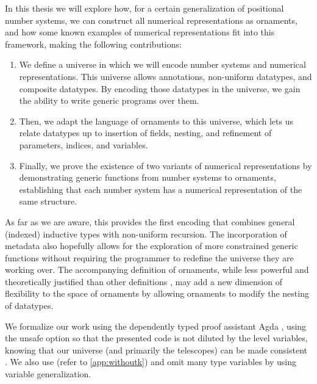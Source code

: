 In this thesis we will explore how, for a certain generalization of positional number systems, we can construct all numerical representations as ornaments, and how some known examples of numerical representations fit into this framework, making the following contributions:
\begin{enumerate}
    \item We define a universe in which we will encode number systems and numerical representations. This universe allows annotations, non-uniform datatypes, and composite datatypes. By encoding those datatypes in the universe, we gain the ability to write generic programs over them.
    \item Then, we adapt the language of ornaments to this universe, which lets us relate datatypes up to insertion of fields, nesting, and refinement of parameters, indices, and variables.
    \item Finally, we prove the existence of two variants of numerical representations by demonstrating generic functions from number systems to ornaments, establishing that each number system has a numerical representation of the same structure.
\end{enumerate}
As far as we are aware, this provides the first encoding that combines general (indexed) inductive types with non-uniform recursion. The incorporation of metadata also hopefully allows for the exploration of more constrained generic functions %
without requiring the programmer to redefine the universe they are working over. The accompanying definition of ornaments, while less powerful and theoretically justified than other definitions \cite{sijsling,kophd}, may add a new dimension of flexibility to the space of ornaments by allowing ornaments to modify the nesting of datatypes.

We formalize our work using the dependently typed proof assistant Agda \cite{agda}, using the unsafe  option so that the presented code is not diluted by the level variables, knowing that our universe (and primarily the telescopes) can be made consistent \cite{practgen}. We also use  (refer to \autoref{app:withoutk}) and omit many type variables by using variable generalization.

%
